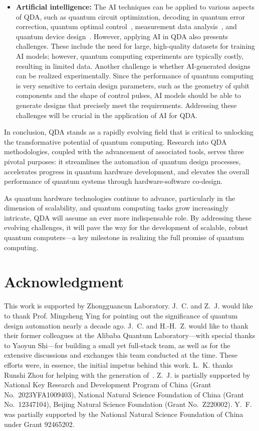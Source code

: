 \documentclass[a4paper,onecolumn,11pt,unpublished]{quantumarticle}
\begin{document}
\begin{itemize}
    \item \textbf{Artificial intelligence: }The AI techniques can be applied to various aspects of QDA, such as quantum circuit optimization, decoding in quantum error correction, quantum optimal control~\cite{Sivak2022ModelFree, Nguyen2024ReinforcementLearningPulse, Genois2024quantumoptimalcontrolsuperconducting}, measurement data analysis~\cite{Castelano2023physicsinformedneuralnetworks, Kung2025Automatic}, and quantum device design~\cite{Ai2025SQCwithGNN}. However, applying AI in QDA also presents challenges. These include the need for large, high-quality datasets for training AI models; however, quantum computing experiments are typically costly, resulting in limited data. Another challenge is whether AI-generated designs can be realized experimentally. Since the performance of quantum computing is very sensitive to certain design parameters, such as the geometry of qubit components and the shape of control pulses, AI models should be able to generate designs that precisely meet the requirements. Addressing these challenges will be crucial in the application of AI for QDA.
\end{itemize}

In conclusion, QDA stands as a rapidly evolving field that is critical to unlocking the transformative potential of quantum computing. Research into QDA methodologies, coupled with the advancement of associated tools, serves three pivotal purposes: it streamlines the automation of quantum design processes, accelerates progress in quantum hardware development, and elevates the overall performance of quantum systems through hardware-software co-design.

As quantum hardware technologies continue to advance, particularly in the dimension of scalability, and quantum computing tasks grow increasingly intricate, QDA will assume an ever more indispensable role. By addressing these evolving challenges, it will pave the way for the development of scalable, robust quantum computers---a key milestone in realizing the full promise of quantum computing.


\section*{Acknowledgment}

This work is supported by Zhongguancun Laboratory. 
J.~C. and Z.~J. would like to thank Prof. Mingsheng Ying for pointing out the significance of quantum design automation nearly a decade ago. J.~C. and H.-H.~Z. would like to thank their former colleagues at the Alibaba Quantum Laboratory---with special thanks to Yaoyun Shi---for building a small yet full-stack team, as well as for the extensive discussions and exchanges this team conducted at the time. These efforts were, in essence, the initial impetus behind this work. L.~K. thanks Runshi Zhou for helping with the generation of~. Z.~J. is partially supported by National Key Research and Development Program of China (Grant No.\ 2023YFA1009403), National Natural Science Foundation of China (Grant No.\ 12347104), Beijing Natural Science Foundation (Grant No.\ Z220002). Y.~F. was partially supported by the National Natural Science Foundation of China under Grant 92465202.



\end{document}
